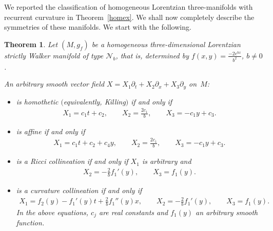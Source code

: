 \documentclass[pdftex]{sigma}
\numberwithin{equation}{section}
\newtheorem{Theorem}{Theorem}[section]
\begin{document}
We reported the classif\/ication of homogeneous Lorentzian three-manifolds with recurrent curvature in Theorem~\ref{homex}. We shall now completely describe the symmetries of these manifolds. We start with the following.

\begin{Theorem}
Let $(M,g_f)$ be a homogeneous three-dimensional Lorentzian strictly Walker mani\-fold of type $\mathcal N_b$, that is, determined by
$f(x,y)=\frac{-2e^{bx}}{b^2}$, $b\neq 0$.

An arbitrary smooth vector field $X=X_1\partial_t+X_2\partial_x+X_3\partial_y$ on~$M$:
\begin{itemize}\itemsep=0pt
\item is homothetic $($equivalently, Killing$)$ if and only if
\begin{gather*}X_1=c_1t+c_2, \qquad X_2=\frac{2c_1}{b}, \qquad X_3=-c_1y+c_3.\end{gather*}
\item is affine if and only if
\begin{gather*}X_1=c_1t+c_2+c_4y,\qquad X_2=\frac{2c_1}{b},\qquad X_3=-c_1y+c_3.\end{gather*}
\item is a Ricci collineation if and only if $X_1$ is arbitrary and
\begin{gather*} X_2=-\frac2b f_1 '(y),\qquad X_3=f_1(y).\end{gather*}
\item is a curvature collineation if and only if{\samepage
\begin{gather*}X_1=f_2(y)-f_1 '(y) t+\frac2bf_1 ''(y)x,\qquad X_2=-\frac 2bf_1 '(y),\qquad X_3=f_1(y).\end{gather*}
In the above equations, $c_j $ are real constants and $f_1(y)$ an arbitrary smooth function.}
\end{itemize}
\end{Theorem}
\end{document}
